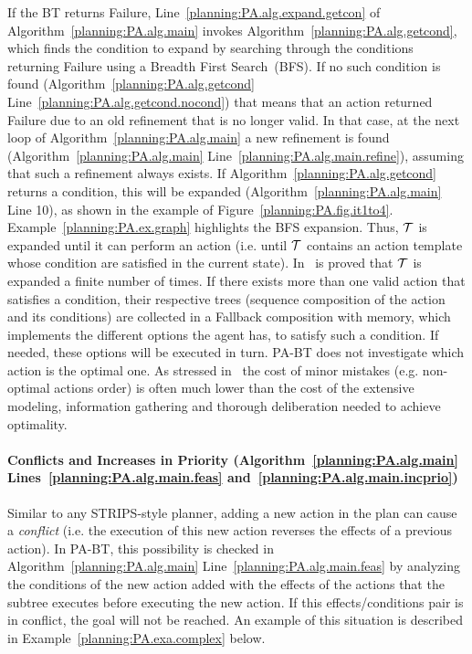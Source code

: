If the BT returns Failure, Line~\ref{planning:PA.alg.expand.getcon} of Algorithm~\ref{planning:PA.alg.main} invokes Algorithm~\ref{planning:PA.alg.getcond}, which finds the condition to expand by searching through the conditions returning Failure using a Breadth First Search~(BFS). If no such condition is found (Algorithm~\ref{planning:PA.alg.getcond} Line~\ref{planning:PA.alg.getcond.nocond}) that means that an action returned Failure due to an old refinement that is no longer valid. In that case, at the next loop of Algorithm~\ref{planning:PA.alg.main} a new refinement is found (Algorithm~\ref{planning:PA.alg.main} Line~\ref{planning:PA.alg.main.refine}), assuming that such a refinement always exists. If Algorithm~\ref{planning:PA.alg.getcond} returns a condition, this will be expanded (Algorithm~\ref{planning:PA.alg.main} Line 10), as shown in the example of Figure~\ref{planning:PA.fig.it1to4}. Example~\ref{planning:PA.ex.graph}  highlights the BFS expansion.
Thus, $\mathcal{T}$ is expanded until it can perform an action (i.e. until $\mathcal{T}$ contains an action template whose condition are satisfied in the current state). In~\cite{colledanchise2016towards} is proved that $\mathcal{T}$ is expanded a finite number of times.
If there exists more than one valid action that satisfies a condition, their respective trees (sequence composition of the action and its conditions) are collected in a Fallback composition {with memory}, which implements the different options the agent has, to satisfy such a condition. {If needed, these options will be executed in turn.}
PA-BT does not investigate which action is the optimal one. As stressed in~\cite{ghallab2016automated} the cost of minor mistakes (e.g. non-optimal actions order) is often much lower than the cost of the extensive modeling, information gathering and thorough deliberation needed to achieve optimality.


\paragraph*{\textbf{Conflicts and Increases in Priority (Algorithm~\ref{planning:PA.alg.main} Lines~\ref{planning:PA.alg.main.feas} and~\ref{planning:PA.alg.main.incprio})}\\}
Similar to any STRIPS-style planner, adding a new action  in the plan can cause a \emph{conflict} (i.e. the execution of this new action reverses the effects of a previous action). %
In PA-BT, this possibility is checked in Algorithm~\ref{planning:PA.alg.main}  Line~\ref{planning:PA.alg.main.feas} by analyzing the conditions of the new action added with the effects of the actions that the subtree executes before executing the new action. If this effects/conditions pair is in conflict, the goal will not be reached.  An example of this situation is described in Example~\ref{planning:PA.exa.complex} below.

